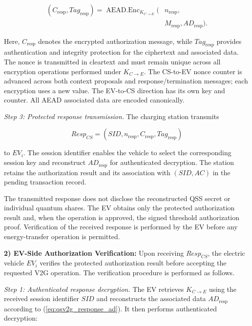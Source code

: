 \documentclass[twocolumn,10pt,journal]{IEEEtran}
\begin{document}
\begin{equation}
\begin{aligned}
(C_{\mathrm{resp}},Tag_{\mathrm{resp}})
=
\operatorname{AEAD.Enc}_{K_{C\to E}}\big(
&n_{\mathrm{resp}},\\
&M_{\mathrm{resp}},
AD_{\mathrm{resp}}
\big).
\end{aligned}
\label{eq:qsv2g_response_encryption}
\end{equation}

Here, $C_{\mathrm{resp}}$ denotes the encrypted
authorization message, while
$Tag_{\mathrm{resp}}$ provides authentication
and integrity protection for the ciphertext
and associated data. The nonce is transmitted
in cleartext and must remain unique across
all encryption operations performed under
$K_{C\to E}$. The CS-to-EV nonce counter is advanced across both context
proposals and response/termination messages; each encryption
uses a new value. The EV-to-CS direction has its own key and
counter. All AEAD associated data are encoded canonically.

\textit{Step 3: Protected response transmission.}
The charging station transmits

\begin{equation}
Resp_{CS} =
\left(
SID,n_{\mathrm{resp}},
C_{\mathrm{resp}},
Tag_{\mathrm{resp}}
\right)
\label{eq:qsv2g_protected_response}
\end{equation}

to $EV_i$. The session identifier enables
the vehicle to select the corresponding
session key and reconstruct
$AD_{\mathrm{resp}}$ for authenticated
decryption. The station retains the
authorization result and its association
with $(SID,AC)$ in the pending transaction
record.

The transmitted response does not disclose
the reconstructed QSS secret or individual
quantum shares. The EV obtains only the
protected authorization result and, when
the operation is approved, the signed
threshold authorization proof. Verification
of the received response is performed by
the EV before any energy-transfer operation
is permitted.


\noindent\textbf{2) EV-Side Authorization Verification:}
Upon receiving $Resp_{CS}$, the electric vehicle
$EV_i$ verifies the protected authorization result
before accepting the requested V2G operation.
The verification procedure is performed as follows.

\textit{Step 1: Authenticated response decryption.}
The EV retrieves $K_{C\to E}$ using the received
session identifier $SID$ and reconstructs the
associated data $AD_{\mathrm{resp}}$ according to
(\ref{eq:qsv2g_response_ad}). It then performs
authenticated decryption:
\end{document}
